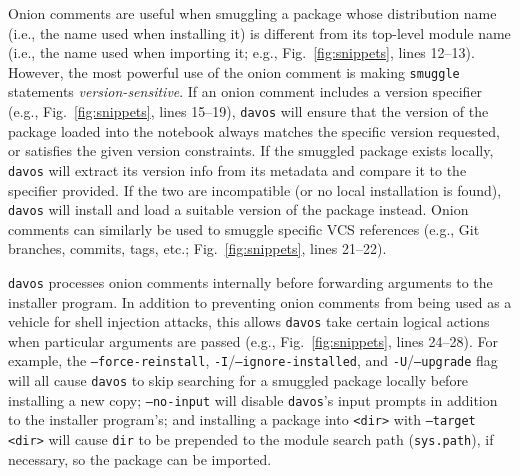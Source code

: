 \documentclass[preprint,12pt,a4paper]{elsarticle}
\begin{document}
Onion comments are useful when smuggling a package whose distribution name (i.e., the name used when installing it) is different from its top-level module name (i.e., the name used when importing it; e.g., Fig.~\ref{fig:snippets}, lines 12--13). However, the most powerful use of the onion comment is making \texttt{smuggle} statements \textit{version-sensitive}. If an onion comment includes a version specifier \cite{CoghStuf13} (e.g., Fig.~\ref{fig:snippets}, lines 15--19), \texttt{davos} will ensure that the version of the package loaded into the notebook always matches the specific version requested, or satisfies the given version constraints. If the smuggled package exists locally, \texttt{davos} will extract its version info from its metadata and compare it to the specifier provided. If the two are incompatible (or no local installation is found), \texttt{davos} will install and load a suitable version of the package instead. Onion comments can similarly be used to smuggle specific VCS references (e.g., Git \cite{TorvHama05}  branches, commits, tags, etc.; Fig.~\ref{fig:snippets}, lines 21--22).


\texttt{davos} processes onion comments internally before forwarding arguments to the installer program. In addition to preventing onion comments from being used as a vehicle for shell injection attacks, this allows \texttt{davos} take certain logical actions when particular arguments are passed (e.g., Fig.~\ref{fig:snippets}, lines 24--28). For example, the \texttt{--force-reinstall}, \texttt{-I}/\texttt{--ignore-installed}, and \texttt{-U}/\texttt{--upgrade} flag will all cause \texttt{davos} to skip searching for a smuggled package locally before installing a new copy; \texttt{--no-input} will disable \texttt{davos}'s input prompts in addition to the installer program's; and installing a package into \texttt{<dir>} with \texttt{--target <dir>} will cause \texttt{dir} to be prepended to the module search path (\texttt{sys.path}), if necessary, so the package can be imported.
\end{document}
